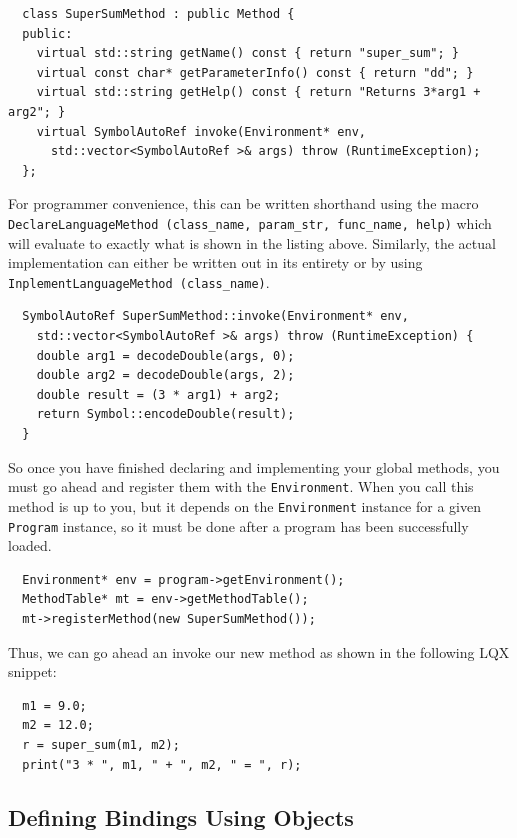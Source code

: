 \documentclass[]{article}
\newcommand{\ModLang}{LQX }
\begin{document}
  \lstset{language=C++}
  \begin{lstlisting}
  class SuperSumMethod : public Method {
  public:
    virtual std::string getName() const { return "super_sum"; } 
    virtual const char* getParameterInfo() const { return "dd"; } 
    virtual std::string getHelp() const { return "Returns 3*arg1 + arg2"; }
    virtual SymbolAutoRef invoke(Environment* env, 
      std::vector<SymbolAutoRef >& args) throw (RuntimeException);
  };
  \end{lstlisting}
  
  For programmer convenience, this can be written shorthand using the macro 
  {\tt DeclareLanguageMethod (class\_name, param\_str, func\_name, help)} which will evaluate to
  exactly what is shown in the listing above. Similarly, the actual implementation can
  either be written out in its entirety or by using {\tt InplementLanguageMethod (class\_name)}.
  
  \lstset{language=C++}
  \begin{lstlisting}
  SymbolAutoRef SuperSumMethod::invoke(Environment* env, 
    std::vector<SymbolAutoRef >& args) throw (RuntimeException) {
    double arg1 = decodeDouble(args, 0);
    double arg2 = decodeDouble(args, 2);
    double result = (3 * arg1) + arg2;
    return Symbol::encodeDouble(result);
  }
  \end{lstlisting}
  
  So once you have finished declaring and implementing your global methods, you must go
  ahead and register them with the {\tt Environment}. When you call this method is up to you,
  but it depends on the {\tt Environment} instance for a given {\tt Program} instance, so
  it must be done after a program has been successfully loaded.
  
  \lstset{language=C++}
  \begin{lstlisting}
  Environment* env = program->getEnvironment();
  MethodTable* mt = env->getMethodTable();
  mt->registerMethod(new SuperSumMethod());
  \end{lstlisting}
  
  Thus, we can go ahead an invoke our new method as shown in the following \ModLang snippet:
  
  \lstset{language=C++}
  \begin{lstlisting}
  m1 = 9.0;
  m2 = 12.0;
  r = super_sum(m1, m2);
  print("3 * ", m1, " + ", m2, " = ", r);
  \end{lstlisting}
  
  \subsection{Defining Bindings Using Objects}
  
\end{document}
